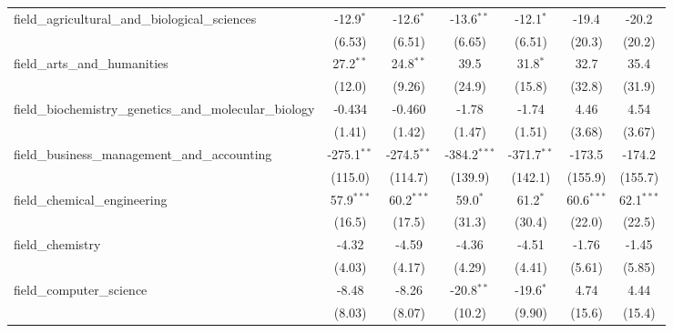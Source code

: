 \begin{tabular}{lcccccc}
   field\_agricultural\_and\_biological\_sciences              & -12.9$^{*}$   & -12.6$^{*}$   & -13.6$^{**}$   & -12.1$^{*}$   & -19.4         & -20.2\\   
                                                               & (6.53)        & (6.51)        & (6.65)         & (6.51)        & (20.3)        & (20.2)\\   
   field\_arts\_and\_humanities                                & 27.2$^{**}$   & 24.8$^{**}$   & 39.5           & 31.8$^{*}$    & 32.7          & 35.4\\   
                                                               & (12.0)        & (9.26)        & (24.9)         & (15.8)        & (32.8)        & (31.9)\\   
   field\_biochemistry\_genetics\_and\_molecular\_biology      & -0.434        & -0.460        & -1.78          & -1.74         & 4.46          & 4.54\\   
                                                               & (1.41)        & (1.42)        & (1.47)         & (1.51)        & (3.68)        & (3.67)\\   
   field\_business\_management\_and\_accounting                & -275.1$^{**}$ & -274.5$^{**}$ & -384.2$^{***}$ & -371.7$^{**}$ & -173.5        & -174.2\\   
                                                               & (115.0)       & (114.7)       & (139.9)        & (142.1)       & (155.9)       & (155.7)\\   
   field\_chemical\_engineering                                & 57.9$^{***}$  & 60.2$^{***}$  & 59.0$^{*}$     & 61.2$^{*}$    & 60.6$^{***}$  & 62.1$^{***}$\\   
                                                               & (16.5)        & (17.5)        & (31.3)         & (30.4)        & (22.0)        & (22.5)\\   
   field\_chemistry                                            & -4.32         & -4.59         & -4.36          & -4.51         & -1.76         & -1.45\\   
                                                               & (4.03)        & (4.17)        & (4.29)         & (4.41)        & (5.61)        & (5.85)\\   
   field\_computer\_science                                    & -8.48         & -8.26         & -20.8$^{**}$   & -19.6$^{*}$   & 4.74          & 4.44\\   
                                                               & (8.03)        & (8.07)        & (10.2)         & (9.90)        & (15.6)        & (15.4)\\   

\end{tabular}
